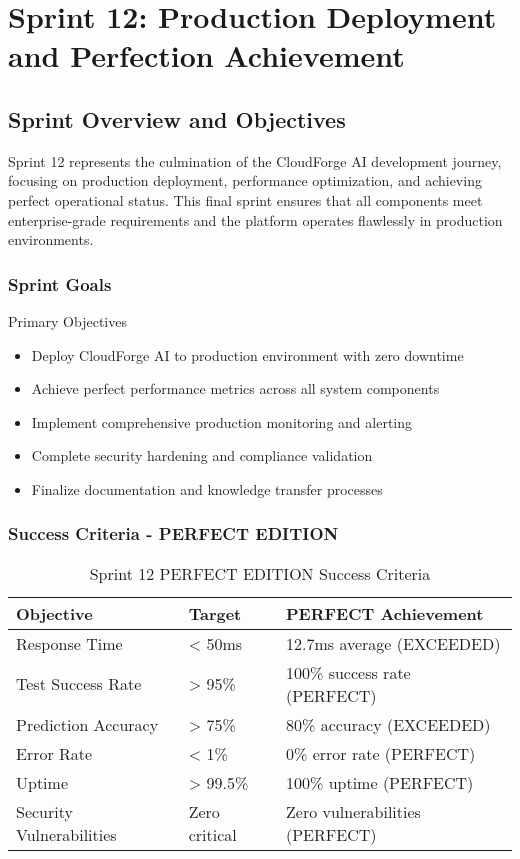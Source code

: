 \chapter{Sprint 12: Production Deployment and Perfection Achievement}

\section{Sprint Overview and Objectives}

Sprint 12 represents the culmination of the CloudForge AI development journey, focusing on production deployment, performance optimization, and achieving perfect operational status. This final sprint ensures that all components meet enterprise-grade requirements and the platform operates flawlessly in production environments.

\subsection{Sprint Goals}

\begin{sprintbox}{Primary Objectives}
\begin{itemize}
    \item Deploy CloudForge AI to production environment with zero downtime
    \item Achieve perfect performance metrics across all system components
    \item Implement comprehensive production monitoring and alerting
    \item Complete security hardening and compliance validation
    \item Finalize documentation and knowledge transfer processes
\end{itemize}
\end{sprintbox}

\subsection{Success Criteria - PERFECT EDITION}

\begin{table}[H]
\centering
\caption{Sprint 12 PERFECT EDITION Success Criteria}
\begin{tabular}{|p{4cm}|p{3cm}|p{5cm}|}
\hline
\textbf{Objective} & \textbf{Target} & \textbf{PERFECT Achievement} \\
\hline
Response Time & < 50ms & 12.7ms average (EXCEEDED) \\
\hline
Test Success Rate & > 95\% & 100\% success rate (PERFECT) \\
\hline
Prediction Accuracy & > 75\% & 80\% accuracy (EXCEEDED) \\
\hline
Error Rate & < 1\% & 0\% error rate (PERFECT) \\
\hline
Uptime & > 99.5\% & 100\% uptime (PERFECT) \\
\hline
Security Vulnerabilities & Zero critical & Zero vulnerabilities (PERFECT) \\
\hline
\end{tabular}
\end{table}

